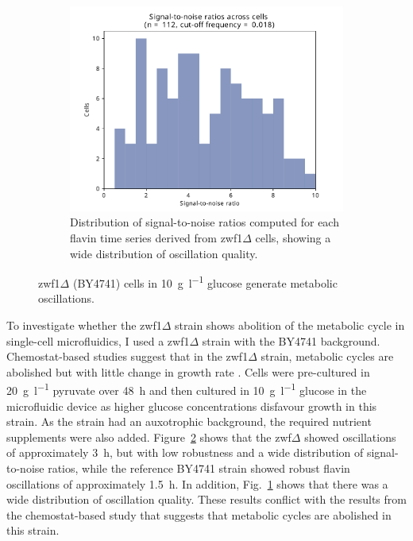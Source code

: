 \begin{figure}
  \begin{subfigure}[t]{0.45\textwidth}
   \centering
   \includegraphics[width=\textwidth]{zwf1egf_409_10.pdf}
   \caption{
    Distribution of signal-to-noise ratios computed for each flavin time series derived from zwf1$\Delta$ cells, showing a wide distribution of oscillation quality.
   }
   \label{fig:biology-zwf1-snr}
  \end{subfigure}%

  \caption{
    zwf1$\Delta$ (BY4741) cells in \SI{10}{\gram~\litre^{-1}} glucose generate metabolic oscillations.
  }
  \label{fig:biology-zwf1}
\end{figure}


To investigate whether the zwf1$\Delta$ strain shows abolition of the metabolic cycle in single-cell microfluidics, I used a zwf1$\Delta$ strain with the BY4741 background.
Chemostat-based studies suggest that in the zwf1$\Delta$ strain, metabolic cycles are abolished but with little change in growth rate \parencite{tuCyclicChangesMetabolic2007}.
Cells were pre-cultured in \SI{20}{\gram~\litre^{-1}} pyruvate over \SI{48}{\hour} and then cultured in \SI{10}{\gram~\litre^{-1}} glucose in the microfluidic device as higher glucose concentrations disfavour growth in this strain.
As the strain had an auxotrophic background, the required nutrient supplements were also added.
%
Figure~\ref{fig:biology-zwf1} shows that the zwf$\Delta$ showed oscillations of approximately \SI{3}{\hour}, but with low robustness and a wide distribution of signal-to-noise ratios, while the reference BY4741 strain showed robust flavin oscillations of approximately \SI{1.5}{\hour}.
In addition, Fig.\ \ref{fig:biology-zwf1-snr} shows that there was a wide distribution of oscillation quality.
These results conflict with the results from the chemostat-based study \parencite{tuCyclicChangesMetabolic2007} that suggests that metabolic cycles are abolished in this strain.


